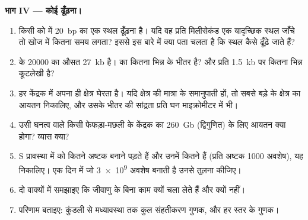 \begin{problem}
\medskip
\noindent\textbf{भाग IV --- कोई  ढूँढ़ना।}
\begin{enumerate}[resume]
  \item किसी  को  में \qty{20}{bp} का एक स्थल ढूँढ़ना है।
        यदि वह प्रति मिलीसेकंड एक यादृच्छिक स्थल जाँचे तो खोज में कितना
        समय लगता? इससे इस बारे में क्या पता चलता है कि स्थल कैसे ढूँढ़े
        जाते हैं?
  \item {} के \qty{20000}{}  का औसत \qty{27}{kb} है।  का
        कितना भिन्न  के भीतर है? और प्रति  \qty{1.5}{kb}
         पर कितना भिन्न कूटलेखी है?
  \item हर  केंद्रक में अपना ही क्षेत्र घेरता है।
        यदि क्षेत्र  की मात्रा के समानुपाती हों, तो सबसे बड़े
         के क्षेत्र का आयतन निकालिए, और उसके भीतर  की
        सांद्रता  प्रति घन माइक्रोमीटर में भी।
  \item उसी  घनत्व वाले किसी फेफड़ा-मछली के केंद्रक का
        \qty{260}{Gb} (द्विगुणित) के लिए आयतन क्या होगा? व्यास क्या?
  \item S प्रावस्था में  को कितने  अष्टक बनाने पड़ते हैं
        और उनमें कितने  हैं (प्रति अष्टक \qty{1000}{}
        अवशेष), यह निकालिए।  एक दिन में जो \qty{3e9}{} 
        अवशेष बनाती है उनसे तुलना कीजिए।
  \item दो वाक्यों में समझाइए कि जीवाणु  के बिना काम क्यों
        चला लेते हैं और  क्यों नहीं।
  \item परिणाम बताइए: कुंडली से मध्यावस्था  तक कुल संहतीकरण
        गुणक, और हर स्तर के गुणक।
\end{enumerate}
\end{problem}
